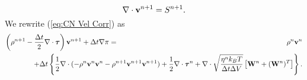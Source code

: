 \documentclass[final]{siamltex}
\def\vb {{\bf v}}
\def\Wb {{\bf W}}
\def\taub {\boldsymbol{\tau}}
\def\half   {\frac{1}{2}}
\begin{document}
\begin{equation}
\nabla\cdot\vb^{n+1} = S^{n+1}.
\end{equation}
We rewrite (\ref{eq:CN Vel Corr}) as
\begin{eqnarray}
\left(\rho^{n+1} - \frac{\Delta t}{2}\nabla\cdot\taub\right)\vb^{n+1} + \Delta t\nabla\pi &=& \rho^n\vb^n\nonumber\\
&&\hspace{-1.75in}+ \Delta t\left\{\half\nabla\cdot(-\rho^n\vb^n\vb^n-\rho^{n+1}\vb^{n+1}\vb^{n+1}) + \half\nabla\cdot\taub^n + \nabla\cdot\sqrt{\frac{\eta^n k_B T}{\Delta t\Delta V}}\left[\Wb^n + (\Wb^n)^T\right]\right\}.\nonumber\\
\end{eqnarray}
\end{document}
